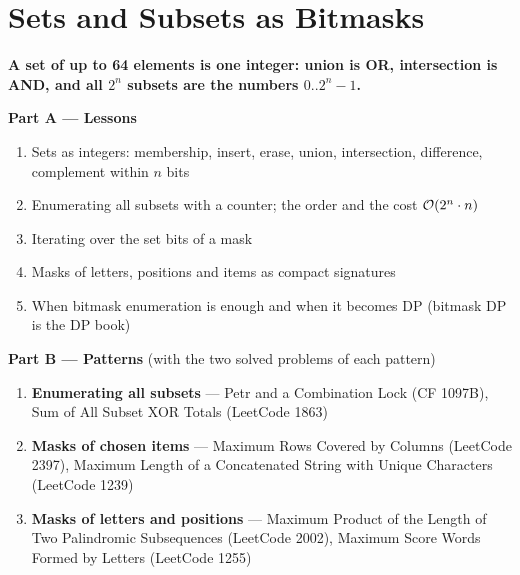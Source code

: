 \chapter{Sets and Subsets as Bitmasks}
\label{ch:subsets}

\begin{tcolorbox}[enhanced, colback=white, colframe=secondaryblue, boxrule=1pt, arc=2mm]
\textbf{\large\textcolor{primaryblue}{A set of up to 64 elements is one integer: union is OR, intersection is AND, and all $2^n$ subsets are the numbers $0..2^n-1$.}}
\end{tcolorbox}


\begin{plannedbox}
\textbf{Part A --- Lessons}
\begin{enumerate}[leftmargin=*, label=\textbf{A\arabic*.}, itemsep=1pt]
    \item Sets as integers: membership, insert, erase, union, intersection, difference, complement within $n$ bits
    \item Enumerating all subsets with a counter; the order and the cost $\mathcal{O}(2^n \cdot n)$
    \item Iterating over the set bits of a mask
    \item Masks of letters, positions and items as compact signatures
    \item When bitmask enumeration is enough and when it becomes DP (bitmask DP is the DP book)
\end{enumerate}
\textbf{Part B --- Patterns} (with the two solved problems of each pattern)
\begin{enumerate}[leftmargin=*, label=\textbf{P\arabic*.}, itemsep=1pt]
    \item \textbf{Enumerating all subsets} --- Petr and a Combination Lock {\small\color{darkgray}(CF 1097B)}, Sum of All Subset XOR Totals {\small\color{darkgray}(LeetCode 1863)}
    \item \textbf{Masks of chosen items} --- Maximum Rows Covered by Columns {\small\color{darkgray}(LeetCode 2397)}, Maximum Length of a Concatenated String with Unique Characters {\small\color{darkgray}(LeetCode 1239)}
    \item \textbf{Masks of letters and positions} --- Maximum Product of the Length of Two Palindromic Subsequences {\small\color{darkgray}(LeetCode 2002)}, Maximum Score Words Formed by Letters {\small\color{darkgray}(LeetCode 1255)}
\end{enumerate}
\end{plannedbox}
